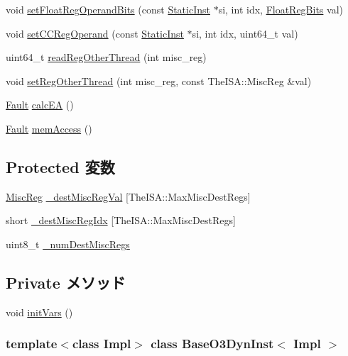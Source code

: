 \begin{DoxyCompactItemize}
\item 
void \hyperlink{classBaseO3DynInst_a80a516966713c873cf964af7538dbd37}{setFloatRegOperandBits} (const \hyperlink{classStaticInst}{StaticInst} $\ast$si, int idx, \hyperlink{classBaseO3DynInst_aab5eeae86499f9bfe15ef79360eccc64}{FloatRegBits} val)
\item 
void \hyperlink{classBaseO3DynInst_afeb2b876cf6b29215cf9d6d56ba8863b}{setCCRegOperand} (const \hyperlink{classStaticInst}{StaticInst} $\ast$si, int idx, uint64\_\-t val)
\item 
uint64\_\-t \hyperlink{classBaseO3DynInst_a77cf978e7a92e33083fcc62cb7ead74d}{readRegOtherThread} (int misc\_\-reg)
\item 
void \hyperlink{classBaseO3DynInst_af05ac53fdafd8a612ca89f90b0c12910}{setRegOtherThread} (int misc\_\-reg, const TheISA::MiscReg \&val)
\item 
\hyperlink{classRefCountingPtr}{Fault} \hyperlink{classBaseO3DynInst_a1a338741bddb2eb956bda5a4188949cf}{calcEA} ()
\item 
\hyperlink{classRefCountingPtr}{Fault} \hyperlink{classBaseO3DynInst_a59a68ea55d45f5f193a5f0396b79e036}{memAccess} ()
\end{DoxyCompactItemize}
\subsection*{Protected 変数}
\begin{DoxyCompactItemize}
\item 
\hyperlink{classBaseO3DynInst_aaf5f073a387db0556d1db4bcc45428bc}{MiscReg} \hyperlink{classBaseO3DynInst_a337a2257f9bbbe5447a9d37b5f90745f}{\_\-destMiscRegVal} \mbox{[}TheISA::MaxMiscDestRegs\mbox{]}
\item 
short \hyperlink{classBaseO3DynInst_acb44bcca662946d56b308535bf3a53e8}{\_\-destMiscRegIdx} \mbox{[}TheISA::MaxMiscDestRegs\mbox{]}
\item 
uint8\_\-t \hyperlink{classBaseO3DynInst_a38e35288fa007817d30cbd80ceb43400}{\_\-numDestMiscRegs}
\end{DoxyCompactItemize}
\subsection*{Private メソッド}
\begin{DoxyCompactItemize}
\item 
void \hyperlink{classBaseO3DynInst_a1b19937d8cca25bf52a51ae7de67ea94}{initVars} ()
\end{DoxyCompactItemize}
\subsubsection*{template$<$class Impl$>$ class BaseO3DynInst$<$ Impl $>$}



